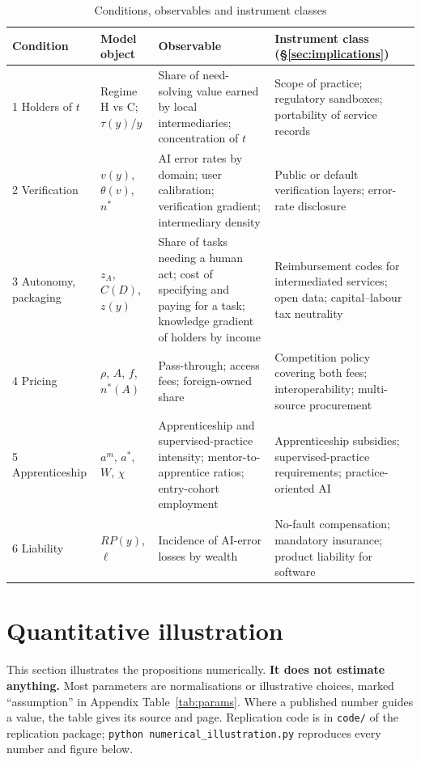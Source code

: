 \documentclass[12pt]{article}
\theoremstyle{remark}
\begin{document}
\begin{table}[t]\centering\small
\caption{Conditions, observables and instrument classes}\label{tab:conditions}
\begin{tabular}{p{}p{}p{}p{}}
\toprule
Condition & Model object & Observable & Instrument class (\S\ref{sec:implications})\\
\midrule
1 Holders of $t$ & Regime H vs C; $\tau(y)/y$ & Share of need-solving value earned by local intermediaries; concentration of $t$ & Scope of practice; regulatory sandboxes; portability of service records\\
2 Verification & $v(y)$, $\theta(v)$, $n^*$ & AI error rates by domain; user calibration; verification gradient; intermediary density & Public or default verification layers; error-rate disclosure\\
3 Autonomy, packaging & $z_A$, $C(D)$, $z(y)$ & Share of tasks needing a human act; cost of specifying and paying for a task; knowledge gradient of holders by income & Reimbursement codes for intermediated services; open data; capital--labour tax neutrality\\
4 Pricing & $\rho$, $A$, $f$, $n^*(A)$ & Pass-through; access fees; foreign-owned share & Competition policy covering both fees; interoperability; multi-source procurement\\
5 Apprenticeship & $a^m$, $a^*$, $W$, $\chi$ & Apprenticeship and supervised-practice intensity; mentor-to-apprentice ratios; entry-cohort employment & Apprenticeship subsidies; supervised-practice requirements; practice-oriented AI\\
6 Liability & $RP(y)$, $\ell$ & Incidence of AI-error losses by wealth & No-fault compensation; mandatory insurance; product liability for software\\
\bottomrule
\end{tabular}
\end{table}

\section{Quantitative illustration}\label{sec:quant}

This section illustrates the propositions numerically. \textbf{It does not estimate anything.} Most parameters are normalisations or illustrative choices, marked ``assumption'' in Appendix Table~\ref{tab:params}. Where a published number guides a value, the table gives its source and page. Replication code is in \texttt{code/} of the replication package; \texttt{python numerical\_illustration.py} reproduces every number and figure below.
\end{document}
